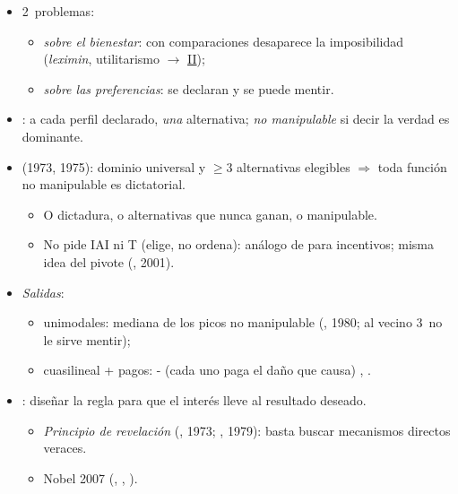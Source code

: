 \documentclass{article}
\begin{document}
\begin{columnas}
\begin{itemize}
\item 2~problemas:
  \begin{itemize}
  \item \emph{sobre el bienestar}: con comparaciones desaparece la imposibilidad (\emph{leximin}, utilitarismo $\to$ \hyperref[rep:II]{II});
  \item \emph{sobre las preferencias}: se declaran y se puede mentir.
  \end{itemize}
\item {}: a cada perfil declarado, \emph{una} alternativa; \emph{no manipulable} si decir la verdad es dominante.
\item {} (1973, 1975): dominio universal y $\geq3$ alternativas elegibles $\Rightarrow$ toda función no manipulable es dictatorial.
  \begin{itemize}
  \item O dictadura, o alternativas que nunca ganan, o manipulable.
  \item No pide IAI ni T (elige, no ordena): análogo de  para incentivos; misma idea del pivote (, 2001).
  \end{itemize}
\item \emph{Salidas}:
  \begin{itemize}
  \item unimodales: mediana de los picos no manipulable (, 1980; al vecino 3~no le sirve mentir);
  \item cuasilineal + pagos: - (cada uno paga el daño que causa) , .
  \end{itemize}
\item {}: diseñar la regla para que el interés lleve al resultado deseado.
  \begin{itemize}
  \item \emph{Principio de revelación} (, 1973; , 1979): basta buscar mecanismos directos veraces.
  \item Nobel 2007 (, , ).
  \end{itemize}
\end{itemize}


\end{columnas}
\end{document}
